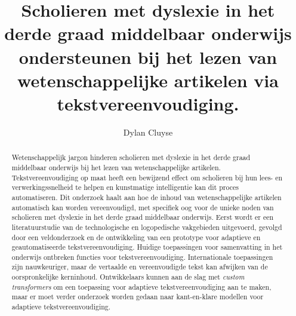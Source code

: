 \documentclass{hogent-article}
\title{Scholieren met dyslexie in het derde graad middelbaar onderwijs ondersteunen bij het lezen van wetenschappelijke artikelen via tekstvereenvoudiging.}
\author{Dylan Cluyse}
\begin{document}
	
\begin{abstract}
Wetenschappelijk jargon hinderen scholieren met dyslexie in het derde graad middelbaar onderwijs bij het lezen van wetenschappelijke artikelen. Tekstvereenvoudiging op maat heeft een bewijzend effect om scholieren bij hun lees- en verwerkingssnelheid te helpen en kunstmatige intelligentie kan dit proces automatiseren. Dit onderzoek haalt aan hoe de inhoud van wetenschappelijke artikelen automatisch kan worden vereenvoudigd, met specifiek oog voor de unieke noden van scholieren met dyslexie in het derde graad middelbaar onderwijs. Eerst wordt er een literatuurstudie van de technologische en logopedische vakgebieden uitgevoerd, gevolgd door een veldonderzoek en de ontwikkeling van een prototype voor adaptieve en geautomatiseerde tekstvereenvoudiging. Huidige toepassingen voor samenvatting in het onderwijs ontbreken functies voor tekstvereenvoudiging. Internationale toepassingen zijn nauwkeuriger, maar de vertaalde en vereenvoudigde tekst kan afwijken van de oorspronkelijke kerninhoud. Ontwikkelaars kunnen aan de slag met \textit{custom transformers} om een toepassing voor adaptieve tekstvereenvoudiging aan te maken, maar er moet verder onderzoek worden gedaan naar kant-en-klare modellen voor adaptieve tekstvereenvoudiging.
\end{abstract}


\tableofcontents



\printbibliography[heading=bibintoc]
\end{document}

